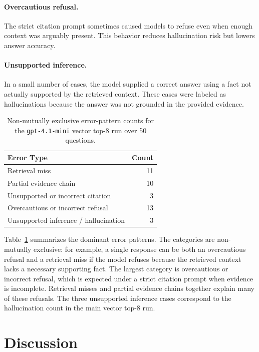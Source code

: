 \documentclass[10pt,twocolumn]{article}
\begin{document}
\paragraph{Overcautious refusal.}
The strict citation prompt sometimes caused models to refuse even when enough context was arguably present. This behavior reduces hallucination risk but lowers answer accuracy.

\paragraph{Unsupported inference.}
In a small number of cases, the model supplied a correct answer using a fact not actually supported by the retrieved context. These cases were labeled as hallucinations because the answer was not grounded in the provided evidence.

\begin{table}[t]
\centering
\small
\begin{tabular}{lr}
\toprule
\textbf{Error Type} & \textbf{Count} \\
\midrule
Retrieval miss & 11 \\
Partial evidence chain & 10 \\
Unsupported or incorrect citation & 3 \\
Overcautious or incorrect refusal & 13 \\
Unsupported inference / hallucination & 3 \\
\bottomrule
\end{tabular}
\caption{Non-mutually exclusive error-pattern counts for the \texttt{gpt-4.1-mini} vector top-8 run over 50 questions.}
\label{tab:error-counts}
\end{table}

Table~\ref{tab:error-counts} summarizes the dominant error patterns. The categories are non-mutually exclusive: for example, a single response can be both an overcautious refusal and a retrieval miss if the model refuses because the retrieved context lacks a necessary supporting fact. The largest category is overcautious or incorrect refusal, which is expected under a strict citation prompt when evidence is incomplete. Retrieval misses and partial evidence chains together explain many of these refusals. The three unsupported inference cases correspond to the hallucination count in the main vector top-8 run.

\section{Discussion}
\end{document}
